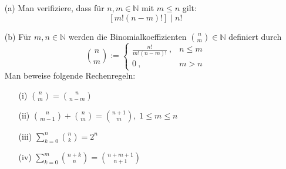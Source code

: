 \setcounter{aufgabe}{4}
\begin{aufgabe}
	\begin{enumerate}
		\item[(a)] Man verifiziere, dass für $n, m \in \mathbb N$ mit $m \leq n$ gilt:
			\[
				\left[ m! (n-m)! \right] \mid n!
			\]
		\item[(b)] Für $m, n \in \mathbb N$ werden die Binomialkoeffizienten $\binom n m \in \mathbb N$
			definiert durch
			\[
				\binom n m := \begin{cases} \frac{n!}{m! (n-m)!} \ , & n \leq m \\ 0 \ , & m > n \end{cases}
			\]
			Man beweise folgende Rechenregeln:
			\begin{enumerate}
				\item[(i)] $ \binom n m = \binom{n}{n-m} $
				\item[(ii)] $\binom{n}{m-1} + \binom{n}{m} = \binom{n+1}{m}, \; 1 \leq m \leq n$
				\item[(iii)] $\sum_{k=0}^n \binom n k = 2^n$
				\item[(iv)] $\sum_{k=0}^m \binom{n+k}{n} = \binom{n+m+1}{n+1} $
			\end{enumerate}
	\end{enumerate}
\end{aufgabe}
